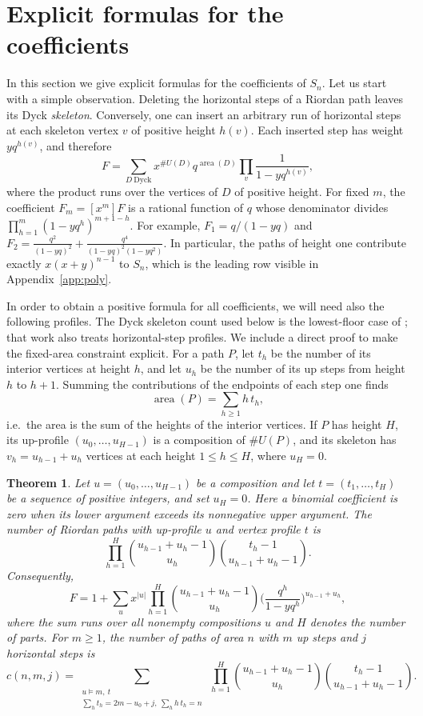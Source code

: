 \documentclass[11pt,reqno]{amsart}
\numberwithin{equation}{section}
\newtheorem{theorem}{Theorem}[section]
\theoremstyle{remark}
\newcommand{\area}{\operatorname{area}}
\begin{document}
\section{Explicit formulas for the coefficients}\label{sec:coef}

In this section we give explicit formulas for the coefficients of $S_n$. Let us start
with a simple observation. Deleting the horizontal steps of a Riordan path leaves its
Dyck \emph{skeleton}. Conversely, one can insert an arbitrary run of horizontal steps at
each skeleton vertex $v$ of positive height $h(v)$. Each inserted step has weight
$yq^{h(v)}$, and therefore
\begin{equation}\label{eq:skel}
F=\sum_{D\ \mathrm{Dyck}}x^{\#U(D)}q^{\area(D)}\prod_{v}\frac1{1-yq^{h(v)}},
\end{equation}
where the product runs over the vertices of $D$ of positive height. For fixed $m$, the
coefficient $F_m=[x^m]F$ is a rational function of $q$ whose denominator divides
$\prod_{h=1}^m(1-yq^h)^{m+1-h}$. For example, $F_1=q/(1-yq)$ and
$F_2=\frac{q^2}{(1-yq)^2}+\frac{q^4}{(1-yq)^2(1-yq^2)}$. In particular, the paths of
height one contribute exactly $x(x+y)^{n-1}$ to $S_n$, which is the leading row visible
in Appendix~\ref{app:poly}.

In order to obtain a positive formula for all coefficients, we will need also the
following profiles. The Dyck skeleton count used below is the lowest-floor case of
\cite[Eq.~(18)]{GOP22}; that work also treats horizontal-step profiles. We include a
direct proof to make the fixed-area constraint explicit. For a path $P$, let $t_h$ be the number of its interior vertices at
height $h$, and let $u_h$ be the number of its up steps from height $h$ to $h+1$. Summing
the contributions of the endpoints of each step one finds
\begin{equation}\label{eq:vertex}
\area(P)=\sum_{h\ge1}h\,t_h,
\end{equation}
i.e.\ the area is the sum of the heights of the interior vertices. If $P$ has height $H$,
its up-profile $(u_0,\dots,u_{H-1})$ is a composition of $\#U(P)$, and its skeleton has
$v_h=u_{h-1}+u_h$ vertices at each height $1\le h\le H$, where $u_H=0$.

\begin{theorem}\label{thm:profile}
Let $u=(u_0,\dots,u_{H-1})$ be a composition and let $t=(t_1,\dots,t_H)$ be a sequence of
positive integers, and set $u_H=0$. Here a binomial coefficient is zero when its lower
argument exceeds its nonnegative upper argument. The number of Riordan paths with
up-profile $u$ and vertex profile $t$ is
\[
\prod_{h=1}^{H}\binom{u_{h-1}+u_h-1}{u_h}\binom{t_h-1}{u_{h-1}+u_h-1}.
\]
Consequently,
\[
F=1+\sum_{u}x^{|u|}\prod_{h=1}^{H}\binom{u_{h-1}+u_h-1}{u_h}\Big(\frac{q^h}{1-yq^h}\Big)^{u_{h-1}+u_h},
\]
where the sum runs over all nonempty compositions $u$ and $H$ denotes the number of parts.
For $m\ge1$, the number of paths of area $n$ with $m$ up steps and $j$ horizontal steps
is
\[
c(n,m,j)=\sum_{\substack{u\models m,\ t\\ \sum_ht_h=2m-u_0+j,\ \sum_hh\,t_h=n}}
\ \prod_{h=1}^{H}\binom{u_{h-1}+u_h-1}{u_h}\binom{t_h-1}{u_{h-1}+u_h-1}.
\]
\end{theorem}
\end{document}
